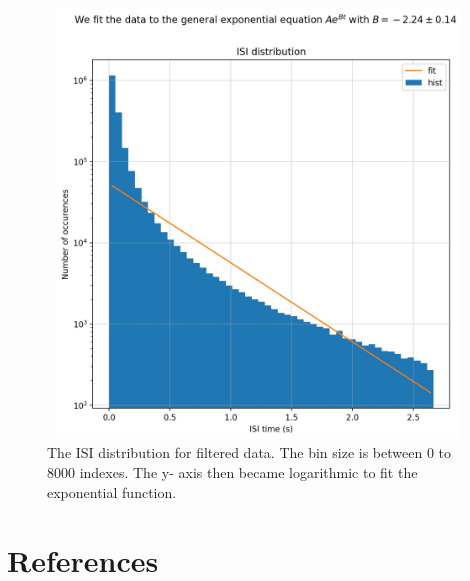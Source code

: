 \documentclass[9pt,twocolumn]{paper-template}
\begin{document}
\begin{figure}
\centering
\includegraphics[width=12cm,height=11.4cm]{isi_logfit.jpg}
\caption{The ISI distribution for filtered data. The bin size is between 0 to 8000 indexes. The y- axis then became logarithmic to fit the exponential function.}\label{fig:side}
\end{figure}

\section*{References}

\end{document}
